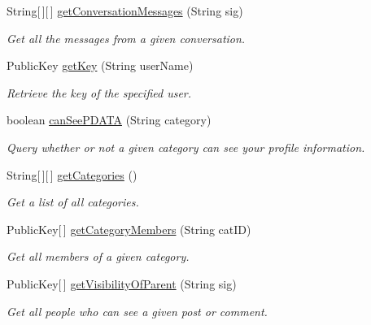 \begin{DoxyCompactItemize}
String\mbox{[}$\,$\mbox{]}\mbox{[}$\,$\mbox{]} \hyperlink{classballmerpeak_1_1turtlenet_1_1server_1_1Database_ac65176a79a8e7433b18e8c98dbc02689}{get\-Conversation\-Messages} (String sig)
\begin{DoxyCompactList}\small\item\em Get all the messages from a given conversation. \end{DoxyCompactList}\item 
Public\-Key \hyperlink{classballmerpeak_1_1turtlenet_1_1server_1_1Database_a67893a85c22e9e5b5a039f1900817df5}{get\-Key} (String user\-Name)
\begin{DoxyCompactList}\small\item\em Retrieve the key of the specified user. \end{DoxyCompactList}\item 
boolean \hyperlink{classballmerpeak_1_1turtlenet_1_1server_1_1Database_ac51008e3d60ba40c4afa37287918a5b7}{can\-See\-P\-D\-A\-T\-A} (String category)
\begin{DoxyCompactList}\small\item\em Query whether or not a given category can see your profile information. \end{DoxyCompactList}\item 
String\mbox{[}$\,$\mbox{]}\mbox{[}$\,$\mbox{]} \hyperlink{classballmerpeak_1_1turtlenet_1_1server_1_1Database_a7f615f18361634692adff5e59c428d84}{get\-Categories} ()
\begin{DoxyCompactList}\small\item\em Get a list of all categories. \end{DoxyCompactList}\item 
Public\-Key\mbox{[}$\,$\mbox{]} \hyperlink{classballmerpeak_1_1turtlenet_1_1server_1_1Database_ad6939a97222c8e7da39726b181220aff}{get\-Category\-Members} (String cat\-I\-D)
\begin{DoxyCompactList}\small\item\em Get all members of a given category. \end{DoxyCompactList}\item 
Public\-Key\mbox{[}$\,$\mbox{]} \hyperlink{classballmerpeak_1_1turtlenet_1_1server_1_1Database_a9e36a1c14ff02a2cc43b38a646ee20ab}{get\-Visibility\-Of\-Parent} (String sig)
\begin{DoxyCompactList}\small\item\em Get all people who can see a given post or comment. \end{DoxyCompactList}\item 

\end{DoxyCompactItemize}
